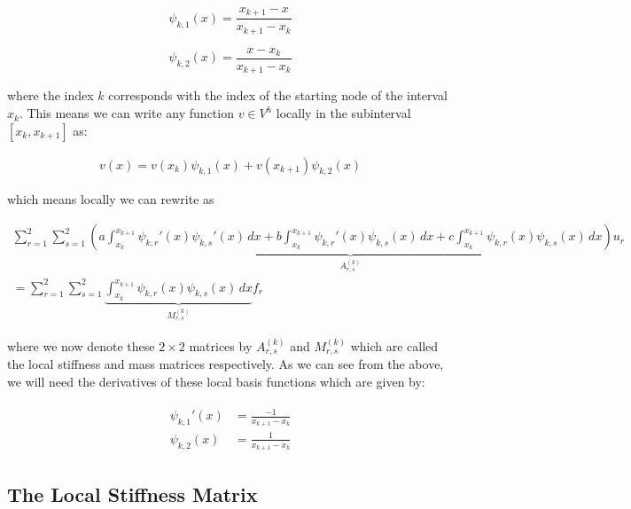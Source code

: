 \begin{equation}
    \psi_{k,1}(x) = \frac{x_{k+1} - x}{x_{k+1} - x_k}
\end{equation}

\begin{equation}
    \psi_{k,2}(x) = \frac{x - x_k}{x_{k+1} - x_k}
\end{equation}

where the index $k$ corresponds with the index of the starting node of the
interval $x_k$.  This means we can write any function $v \in V^h$ locally in
the subinterval $[x_k, x_{k+1}]$ as:

\begin{align*}
    v(x) = v(x_k)\psi_{k,1}(x) + v(x_{k+1})\psi_{k,2}(x)
\end{align*}

which means locally we can rewrite  as

\begin{equation}\label{eq:oned-deterministic-local-discrete}
  \begin{split}
    \sum_{r = 1}^2\sum_{s = 1}^2\underbrace{\left(
          a\int_{x_k}^{x_{k+1}}\psi_{k,r}'(x)\psi_{k,s}'(x)\, dx
        + b\int_{x_k}^{x_{k+1}}\psi_{k,r}'(x)\psi_{k,s}(x)\, dx
        + c\int_{x_k}^{x_{k+1}}\psi_{k,r}(x)\psi_{k,s}(x)\, dx
    \right)}_{A^{(k)}_{r,s}}u_r  \\
    = \sum_{r= 1}^2\sum_{s = 1}^2\underbrace{
            \int_{x_k}^{x_{k+1}}{\psi_{k,r}(x)\psi_{k,s}(x)}\, dx}_{M^{(k)}_{r,s}}f_r
  \end{split}
\end{equation}

where we now denote these $2 \times 2$ matrices by $A^{(k)}_{r,s}$ and
$M^{(k)}_{r,s}$ which are called the local stiffness and mass matrices
respectively. As we can see from the above, we will need the derivatives of
these local basis functions which are given by:

\begin{align}
  \begin{split}
    \psi_{k,1}'(x) &= \frac{-1}{x_{k+1} - x_{k}} \\
    \psi_{k,2}(x) &= \frac{1}{x_{k+1} - x_{k}}
  \end{split}
\end{align}

\subsection{The Local Stiffness Matrix}\label{sec:oned-deterministic-local-stiffness}

